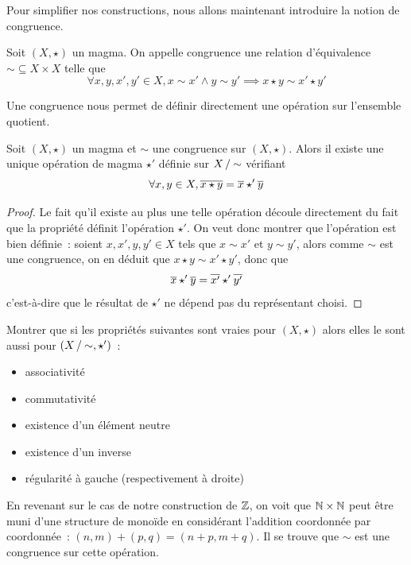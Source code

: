 Pour simplifier nos constructions, nous allons maintenant introduire la notion
de congruence.

\begin{definition}[Congruence]
  Soit $(X,\star)$ un magma. On appelle congruence une relation d'équivalence
  $\mathord{\sim}\subseteq X \times X$ telle que
  \[\forall x,y,x',y' \in X, x\sim x' \land y \sim y'
  \implies x\star y \sim x' \star y'\]
\end{definition}

Une congruence nous permet de définir directement une opération sur l'ensemble
quotient.

\begin{proposition}
  Soit $(X,\star)$ un magma et $\sim$ une congruence sur $(X,\star)$. Alors
  il existe une unique opération de magma $\star'$ définie sur $\mathord{X}\mathbin{/}\mathord{\sim}$
  vérifiant
  \[\forall x,y \in X, \overline{x\star y} = \overline{x}\star' \overline{y}\]
\end{proposition}

\begin{proof}
  Le fait qu'il existe au plus une telle opération découle directement du fait
  que la propriété définit l'opération $\star'$. On veut donc montrer que
  l'opération est bien définie~: soient $x,x',y,y'\in X$ tels que
  $x\sim x'$ et $y\sim y'$, alors comme $\sim$ est une congruence, on en
  déduit que $x\star y \sim x' \star y'$, donc que
  \[\overline{x} \star' \overline{y} = \overline{x'}\star' \overline{y'}\]
  c'est-à-dire que le résultat de $\star'$ ne dépend pas du représentant choisi.
\end{proof}

\begin{exercise}
  Montrer que si les propriétés suivantes sont vraies pour $(X,\star)$ alors
  elles le sont aussi pour $(\mathord{X}\mathbin{/}\mathord{\sim},\star')$~:
  \begin{itemize}
  \item associativité
  \item commutativité
  \item existence d'un élément neutre
  \item existence d'un inverse
  \item régularité à gauche (respectivement à droite)
  \end{itemize}
\end{exercise}

En revenant sur le cas de notre construction de $\mathbb Z$, on voit que
$\mathbb N\times\mathbb N$ peut être muni d'une structure de monoïde en
considérant l'addition coordonnée par coordonnée~: $(n,m)+(p,q) = (n+p,m+q)$.
Il se trouve que $\sim$ est une congruence sur cette opération.

